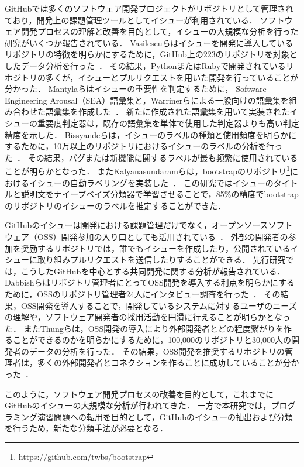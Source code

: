 GitHubでは多くのソフトウェア開発プロジェクトがリポジトリとして管理されており，開発上の課題管理ツールとしてイシューが利用されている．
ソフトウェア開発プロセスの理解と改善を目的として，イシューの大規模な分析を行った研究がいくつか報告されている．
Vasilescuらはイシューを開発に導入しているリポジトリの特徴を明らかにするために，GitHub上の223のリポジトリを対象としたデータ分析を行った~\cite{Continuous_Integration_in_a_Social_Coding_World}．
その結果，PythonまたはRubyで開発されているリポジトリの多くが，イシューとプルリクエストを用いた開発を行っていることが分かった．
Mantylaらはイシューの重要性を判定するために， Software Engineering Arousal（SEA）語彙集と，Warrinerらによる一般向けの語彙集を組み合わせた語彙集を作成した~\cite{Mantyla:issue:word:list}．
新たに作成された語彙集を用いて実装されたイシューの重要度判定器は，既存の語彙集を単体で使用した判定器よりも高い判定精度を示した．
Bissyandeらは，イシューのラベルの種類と使用頻度を明らかにするために，10万以上のリポジトリにおけるイシューのラベルの分析を行った~\cite{Bissyande:gh:issues}．
その結果，バグまたは新機能に関するラベルが最も頻繁に使用されていることが明らかとなった．
またKalyanasundaramらは，bootstrapのリポジトリ\footnote{\url{https://github.com/twbs/bootstrap}}におけるイシューの自動ラベリングを実装した~\cite{kalyanasundaram2014automatic}．
この研究ではイシューのタイトルと説明文をナイーブベイズ分類器で学習させることで，85\%の精度でbootstrapのリポジトリのイシューのラベルを推定することができた．

GitHubのイシューは開発における課題管理だけでなく，オープンソースソフトウェア（OSS）開発参加の入り口としても活用されている~\cite{github_analysis}．
外部の開発者の参加を奨励するリポジトリでは，誰でもイシューを作成したり，公開されているイシューに取り組みプルリクエストを送信したりすることができる．
先行研究では，こうしたGitHubを中心とする共同開発に関する分析が報告されている．
Dabbishらはリポジトリ管理者にとってOSS開発を導入する利点を明らかにするために，OSSのリポジトリ管理者24人にインタビュー調査を行った~\cite{Social_Coding_in_GitHub}．
その結果，OSS開発を導入することで，開発しているシステムに対するユーザのニーズの理解や，ソフトウェア開発者の採用活動を円滑に行えることが明らかとなった．
またThungらは，OSS開発の導入により外部開発者とどの程度繋がりを作ることができるのかを明らかにするために，100,000のリポジトリと30,000人の開発者のデータの分析を行った．
その結果，OSS開発を推奨するリポジトリの管理者は，多くの外部開発者とコネクションを作ることに成功していることが分かった~\cite{Network_Structure_of_Social_Coding}．

このように，ソフトウェア開発プロセスの改善を目的として，これまでにGitHubのイシューの大規模な分析が行われてきた．
一方で本研究では，プログラミング演習問題への転用を目的として，GitHubのイシューの抽出および分類を行うため，新たな分類手法が必要となる．


